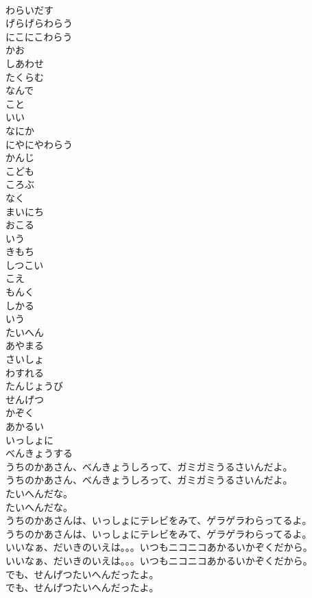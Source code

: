 \documentclass[8pt]{extreport}
\begin{document}
\begin{CJK}{UTF8}{min}
\\	わらいだす
\\	げらげらわらう
\\	にこにこわらう
\\	かお
\\	しあわせ
\\	たくらむ
\\	なんで
\\	こと
\\	いい
\\	なにか
\\	にやにやわらう
\\	かんじ
\\	こども
\\	ころぶ
\\	なく
\\	まいにち
\\	おこる
\\	いう
\\	きもち
\\	しつこい
\\	こえ
\\	もんく
\\	しかる
\\	いう
\\	たいへん
\\	あやまる
\\	さいしょ
\\	わすれる
\\	たんじょうび
\\	せんげつ
\\	かぞく
\\	あかるい
\\	いっしょに
\\	べんきょうする
\\	うちのかあさん、べんきょうしろって、ガミガミうるさいんだよ。	
\\	うちのかあさん、べんきょうしろって、ガミガミうるさいんだよ。 
\\	たいへんだな。	
\\	たいへんだな。 
\\	うちのかあさんは、いっしょにテレビをみて、ゲラゲラわらってるよ。	
\\	うちのかあさんは、いっしょにテレビをみて、ゲラゲラわらってるよ。 
\\	いいなぁ、だいきのいえは。。。いつもニコニコあかるいかぞくだから。	
\\	いいなぁ、だいきのいえは。。。いつもニコニコあかるいかぞくだから。 
\\	でも、せんげつたいへんだったよ。	
\\	でも、せんげつたいへんだったよ。 

\end{CJK}
\end{document}
